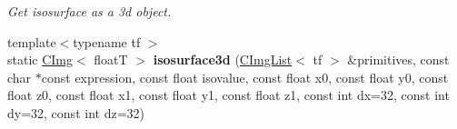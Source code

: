 \begin{DoxyCompactItemize}
\begin{DoxyCompactList}\small\item\em Get isosurface as a 3d object. \item\end{DoxyCompactList}\item 
\hypertarget{structcimg__library_1_1CImg_a7fbf0db5250fdcdbb764b5dda37a2129}{
{\footnotesize template$<$typename tf $>$ }\\static \hyperlink{structcimg__library_1_1CImg}{CImg}$<$ floatT $>$ {\bfseries isosurface3d} (\hyperlink{structcimg__library_1_1CImgList}{CImgList}$<$ tf $>$ \&primitives, const char $\ast$const expression, const float isovalue, const float x0, const float y0, const float z0, const float x1, const float y1, const float z1, const int dx=32, const int dy=32, const int dz=32)}
\label{structcimg__library_1_1CImg_a7fbf0db5250fdcdbb764b5dda37a2129}


\end{DoxyCompactItemize}
